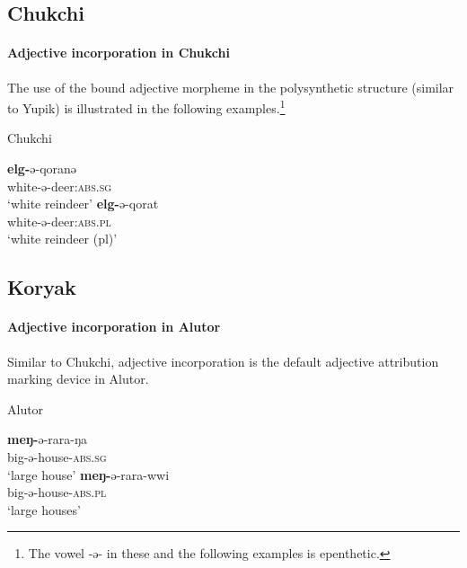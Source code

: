 \subsection{Chukchi}
\paragraph{Adjective incorporation in Chukchi}
The use of the bound adjective morpheme in the polysynthetic structure (similar to Yupik) is illustrated in the following examples.\footnote{The vowel -ə- in these and the following examples is epenthetic.}
\begin{exe}
\ex \rm{Chukchi \citep{skorik1960}}
\begin{xlist}
\ex	
\gll	\textbf{elg-}ə-qoranə\\
	white-ə-deer:\textsc{abs.sg}\\
\glt	‘white reindeer’
\ex
\gll	\textbf{elg-}ə-qorat\\
	white-ə-deer:\textsc{abs.pl}\\
\glt	‘white reindeer (pl)’
\end{xlist}
\end{exe}

\subsection{Koryak}
\paragraph{Adjective incorporation in Alutor}
Similar to Chukchi, adjective incorporation is the default adjective attribution marking device in Alutor.
\begin{exe}
\ex \rm{Alutor \citep{nagayama2003}}
\begin{xlist}
\ex
\gll	\textbf{meŋ-}ə-rara-ŋa\\
	big-ə-house-\textsc{abs.sg}\\
\glt	‘large house’
\ex
\gll	\textbf{meŋ-}ə-rara-wwi\\
	big-ə-house-\textsc{abs.pl}\\
\glt	‘large houses’
\end{xlist}
\end{exe}

